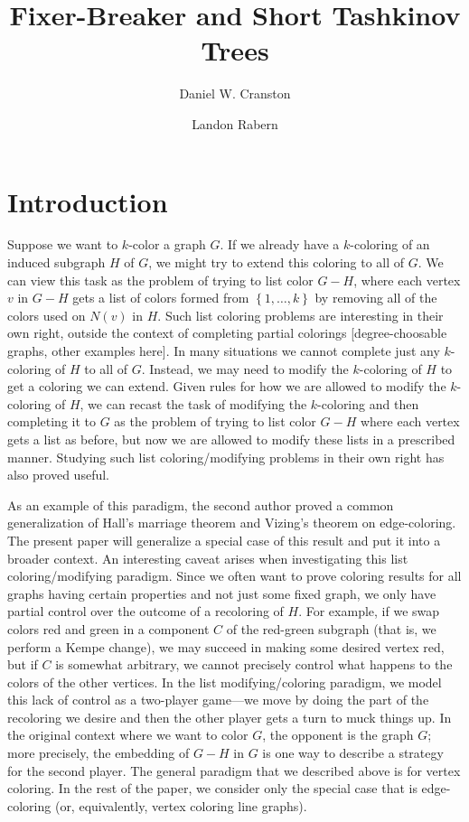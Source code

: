 \documentclass[12pt,reqno]{amsart}
\title{Fixer-Breaker and Short Tashkinov Trees }
\author{Daniel W. Cranston \and Landon Rabern}
\theoremstyle{plain}
\theoremstyle{definition}
\theoremstyle{remark}
\newcommand{\set}[1]{\left\{ #1 \right\}}
\begin{document}
\maketitle

\section{Introduction}
Suppose we want to $k$-color a graph $G$. If we already have a $k$-coloring of
an induced subgraph $H$ of $G$, we might try to extend this coloring to all of
$G$.  We can view this task as the problem of trying to list color $G-H$, where
each vertex $v$ in $G-H$ gets a list of colors formed from $\set{1, \ldots, k}$
by removing all of the colors used on $N(v)$ in $H$.  
Such list coloring problems are interesting in their own right, outside the
context of
completing partial colorings [degree-choosable graphs, other examples here]. 
In many situations we cannot complete just any $k$-coloring of $H$ to all of
$G$.  Instead, we may need to modify the $k$-coloring of $H$ to get a coloring
we can extend.  Given rules for how we are allowed to modify the $k$-coloring
of $H$, we can recast the task of modifying the $k$-coloring and then
completing it to $G$ as the problem of trying to list color $G-H$ where each
vertex gets a list as before, but now we are allowed to modify these lists in a
prescribed manner.  Studying such list coloring/modifying problems in their own
right has also proved useful.  

As an example of this paradigm,
the second author proved \cite{HallGame} 
a common generalization of Hall's marriage theorem and Vizing's theorem on
edge-coloring.  The present paper will generalize a
special case of this result and put it into a broader context.  An interesting
caveat arises when investigating this list coloring/modifying paradigm. 
Since we often want to prove coloring results for all graphs having
certain properties and not just some fixed graph, we only have partial control
over the outcome of a recoloring of $H$. For example, if we swap colors red and
green in a component $C$ of the red-green subgraph (that is, we perform a Kempe
change), we may succeed in making some desired vertex red,
but if $C$ is somewhat arbitrary, we cannot precisely control what happens
to the colors of the other vertices.  In the list modifying/coloring paradigm,
we model this lack of control as a two-player game---we move by doing the part
of the
recoloring we desire and then the other player gets a turn to muck things up. 
In the original context where we want to color $G$, the opponent is the graph
$G$; more precisely, the embedding of $G-H$ in $G$ is one way to describe a
strategy for the second player. 
The general paradigm that we described above is for vertex coloring.  In the
rest of the paper, we consider only the special case that is edge-coloring (or,
equivalently, vertex coloring line graphs).
\end{document}
